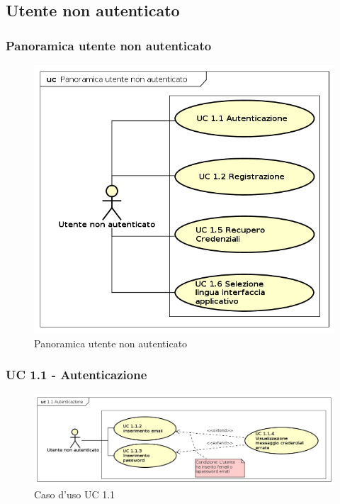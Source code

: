 \subsection{Utente non autenticato}
\subsubsection{Panoramica utente non autenticato}
\begin{figure}[H]
\centering
\includegraphics[width=17cm]{img/UC1.png} 
\caption{Panoramica utente non autenticato}\label{fig:1}
\end{figure}


\subsubsection{UC 1.1 - Autenticazione}

\begin{figure}[H]
\centering
\includegraphics[width=17cm, keepaspectratio]{img/UC11.png} 
\caption{Caso d'uso UC 1.1}
\end{figure}

